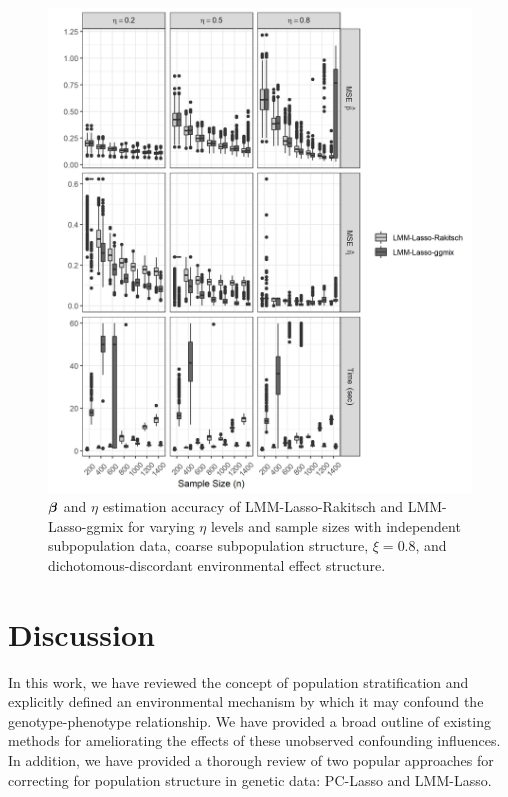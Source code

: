 \begin{figure}[H]
    \centering
    \includegraphics[scale = 1]{figures/eta_beta_hat.png}
     \caption{$\boldsymbol{\beta}{}$ and $\eta$ estimation accuracy of LMM-Lasso-Rakitsch and LMM-Lasso-ggmix for varying $\eta$ levels and sample sizes with independent subpopulation data, coarse subpopulation structure, $\xi = 0.8$, and dichotomous-discordant environmental effect structure.}
    \label{fig:eta_beta_mse}
\end{figure}

\section{Discussion} \label{sec:discussion}

In this work, we have reviewed the concept of population stratification and explicitly defined an environmental mechanism by which it may confound the genotype-phenotype relationship. We have provided a broad outline of existing methods for ameliorating the effects of these unobserved confounding influences. In addition, we have provided a thorough review of two popular approaches for correcting for population structure in genetic data: PC-Lasso and LMM-Lasso. 

